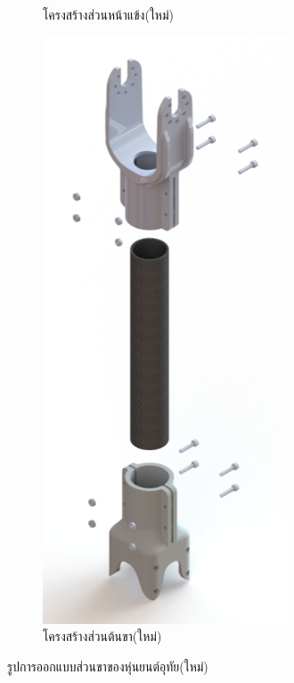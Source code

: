 \begin{figure}[h!]
\begin{subfigure}[b]{0.3\linewidth}
      \caption{โครงสร้างส่วนหน้าแข้ง(ใหม่)}
    \end{subfigure}
    \begin{subfigure}[b]{0.3\linewidth}
      \includegraphics[width=\linewidth]{chapter4/images/carb_thigh.png}
      \caption{โครงสร้างส่วนต้นขา(ใหม่)}
    \end{subfigure}
    \caption{รูปการออกแบบส่วนขาของหุ่นยนต์อุทัย(ใหม่)}
    \label{fig:newleg}
  \end{figure}


